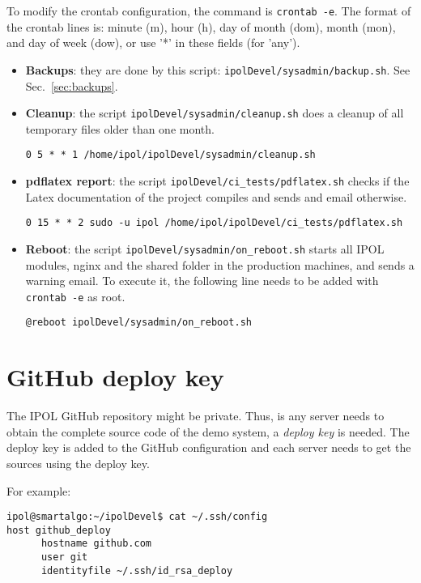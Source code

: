 \documentclass[a4paper,12pt]{article}
\begin{document}
To modify the crontab configuration, the command is {\tt crontab -e}. The format of the crontab lines is: minute (m), hour (h), day of month (dom), month (mon), and day of week (dow), or use '*' in these fields (for 'any').

\begin{itemize}
    \item \textbf{Backups}: they are done by this script: {\tt ipolDevel/sysadmin/backup.sh}. See Sec.~\ref{sec:backups}.

    \item \textbf{Cleanup}: the script {\tt ipolDevel/sysadmin/cleanup.sh} does a cleanup of all temporary files older than one month.

    {\tt 0 5 * * 1 /home/ipol/ipolDevel/sysadmin/cleanup.sh}

    \item \textbf{pdflatex report}: the script {\tt ipolDevel/ci\_tests/pdflatex.sh} checks if the Latex documentation of the project compiles and sends and email otherwise.

    {\tt 0 15 * * 2 sudo -u ipol /home/ipol/ipolDevel/ci\_tests/pdflatex.sh}

    \item \textbf{Reboot}: the script {\tt ipolDevel/sysadmin/on\_reboot.sh} starts all IPOL modules, nginx and the shared folder in the production machines, and sends a warning email. To execute it, the following line needs to be added with {\tt crontab -e} as root.

    {\tt @reboot ipolDevel/sysadmin/on\_reboot.sh}
\end{itemize}

\section{GitHub deploy key}
The IPOL GitHub repository might be private. Thus, is any server needs to obtain the complete source code of the demo system, a \emph{deploy key} is needed. The deploy key is added to the GitHub configuration and each server needs to get the sources using the deploy key.

For example:

\begin{verbatim}
ipol@smartalgo:~/ipolDevel$ cat ~/.ssh/config
host github_deploy
      hostname github.com
      user git
      identityfile ~/.ssh/id_rsa_deploy
\end{verbatim}

\vspace{0.15cm}
\end{document}
